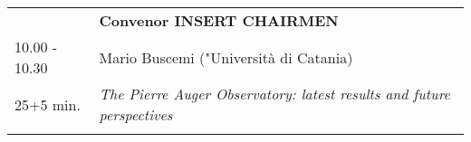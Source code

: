\begin{longtable}{p{3cm}p{13cm}}
&\hfill {\bf Convenor INSERT CHAIRMEN }\\ 
10.00 - 10.30 & Mario Buscemi ("Università di Catania)\\ 
25+5 min. & {\it The Pierre Auger Observatory: latest results and future perspectives}\\ 
 & \\ 
\end{longtable}


